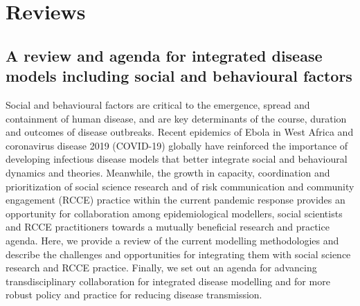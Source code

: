 \documentclass[a4paper,11pt]{scrartcl}
\begin{document}
		
\section{Reviews}

\subsection{A review and agenda for integrated disease models including social and behavioural factors}
Social and behavioural factors are critical to the emergence, spread and containment of human disease, and are key determinants of the course, duration and outcomes of disease outbreaks. Recent epidemics of Ebola in West Africa and coronavirus disease 2019 (COVID-19) globally have reinforced the importance of developing infectious disease models that better integrate social and behavioural dynamics and theories. Meanwhile, the growth in capacity, coordination and prioritization of social science research and of risk communication and community engagement (RCCE) practice within the
current pandemic response provides an opportunity for collaboration among epidemiological modellers, social scientists and RCCE practitioners towards a mutually beneficial research and practice agenda. Here, we provide a review of the current modelling methodologies and describe the challenges and opportunities for integrating them with social science research and RCCE practice. Finally, we set out an agenda for advancing transdisciplinary collaboration for integrated disease modelling and for more robust policy and practice for reducing disease transmission.	
	
	  	
\printbibliography[heading=bibintoc, title={Bibliography}]
\end{document}
